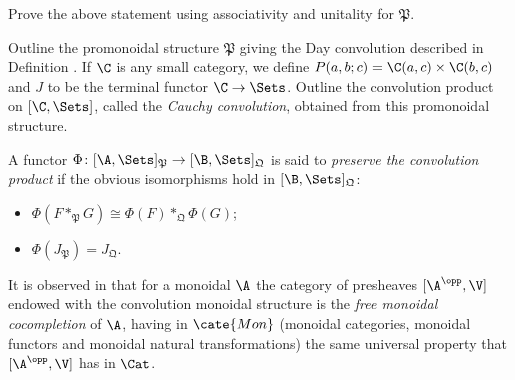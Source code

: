 \begin{exercise}\label{ex1}
Prove the above statement using associativity and unitality for $\mathfrak P$.
\end{exercise}
\begin{exercise}\label{ex2}
Outline the promonoidal structure $\mathfrak P$ giving the Day convolution described in Definition . If $\C$ is any small category, we define $P(a,b;c) = \C(a,c)\times \C(b,c)$ and $J$ to be the terminal functor $\C\to\Sets$. Outline the convolution product on $[\C,\Sets]$, called the \emph{Cauchy convolution}, obtained from this promonoidal structure.
\end{exercise}
\begin{definition}
A functor $\Phi\colon [\A, \Sets]_{\mathfrak P} \to [\B, \Sets]_{\mathfrak Q}$ is said to \emph{preserve the convolution product} if the obvious isomorphisms hold in $[\B, \Sets]_{\mathfrak Q}$:
\begin{itemize}
\item $\Phi(F\ast_{\mathfrak{P}} G) \cong \Phi(F)\ast_{\mathfrak Q}\Phi(G)$;
\item $\Phi(J_{\mathfrak P}) = J_{\mathfrak Q}$.
\end{itemize}
\end{definition}
\begin{remark}
It is observed in \cite{imkelly} that for a monoidal $\A$ the category of presheaves $[\A^\opp,\V]$ endowed with the convolution monoidal structure is the \emph{free monoidal cocompletion} of $\A$, having in $\cate{Mon}$ (monoidal categories, monoidal functors and monoidal natural transformations) the same universal property that $[\A^\opp,\V]$ has in $\Cat$.
\end{remark}